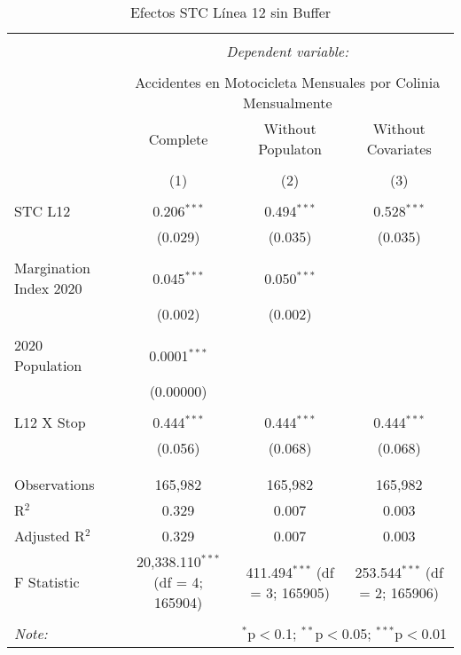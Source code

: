 
\begin{table}[!htbp] \centering 
  \caption{Efectos STC Línea 12 sin Buffer} 
  \label{} 
\begin{tabular}{@{\extracolsep{5pt}}lccc} 
\\[-1.8ex]\hline 
\hline \\[-1.8ex] 
 & \multicolumn{3}{c}{\textit{Dependent variable:}} \\ 
\cline{2-4} 
\\[-1.8ex] & \multicolumn{3}{c}{Accidentes en Motocicleta Mensuales por Colinia Mensualmente} \\ 
 & Complete & Without Populaton & Without Covariates \\ 
\\[-1.8ex] & (1) & (2) & (3)\\ 
\hline \\[-1.8ex] 
 STC L12 & 0.206$^{***}$ & 0.494$^{***}$ & 0.528$^{***}$ \\ 
  & (0.029) & (0.035) & (0.035) \\ 
  & & & \\ 
 Margination Index 2020 & 0.045$^{***}$ & 0.050$^{***}$ &  \\ 
  & (0.002) & (0.002) &  \\ 
  & & & \\ 
 2020 Population & 0.0001$^{***}$ &  &  \\ 
  & (0.00000) &  &  \\ 
  & & & \\ 
 L12 X Stop & 0.444$^{***}$ & 0.444$^{***}$ & 0.444$^{***}$ \\ 
  & (0.056) & (0.068) & (0.068) \\ 
  & & & \\ 
\hline \\[-1.8ex] 
Observations & 165,982 & 165,982 & 165,982 \\ 
R$^{2}$ & 0.329 & 0.007 & 0.003 \\ 
Adjusted R$^{2}$ & 0.329 & 0.007 & 0.003 \\ 
F Statistic & 20,338.110$^{***}$ (df = 4; 165904) & 411.494$^{***}$ (df = 3; 165905) & 253.544$^{***}$ (df = 2; 165906) \\ 
\hline 
\hline \\[-1.8ex] 
\textit{Note:}  & \multicolumn{3}{r}{$^{*}$p$<$0.1; $^{**}$p$<$0.05; $^{***}$p$<$0.01} \\ 
\end{tabular} 
\end{table} 
